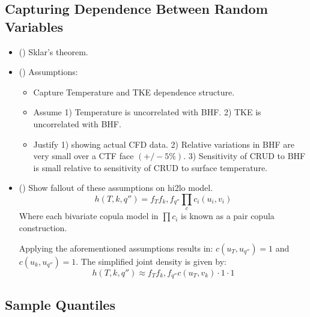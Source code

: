 \subsection{Capturing Dependence Between Random Variables}
\begin{itemize}
        \item (\checkmark) Sklar's theorem.
        \item (\checkmark) Assumptions:
        \begin{itemize}
                \item Capture Temperature and TKE dependence structure.
                \item Assume 1) Temperature is uncorrelated with BHF.  2) TKE is uncorrelated with BHF.
                \item Justify 1) showing actual CFD data. 2) Relative variations in BHF are very small over a CTF face $(+/- 5\%)$.  3) Sensitivity of CRUD to BHF is small relative to sensitivity of CRUD to surface temperature.
        \end{itemize}
        \item (\checkmark) Show fallout of these assumptions on hi2lo model.
        \begin{equation}
                h(T, k, q'') = f_T f_k, f_{q''} \prod_c c_i(u_i, v_i)
        \end{equation}
        Where each bivariate copula model in $\prod c_i $ is known as a pair copula construction.

        Applying the aforementioned assumptions results in: $c(u_T, u_{q''}) = 1$ and $c(u_{k}, u_{q''}) = 1$. The simplified joint density is given by:
        \begin{equation}
                h(T, k, q'') \approx  f_T f_k, f_{q''} c(u_{T}, v_{k})  \cdot 1 \cdot 1
    \end{equation}
\end{itemize}


\subsection{Sample Quantiles}

